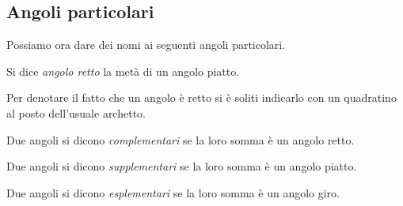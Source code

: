 \subsection{Angoli particolari}

Possiamo ora dare dei nomi ai seguenti angoli particolari.

\begin{definizione}
Si dice \emph{angolo retto} la metà di un angolo piatto.
\end{definizione}

Per denotare il fatto che un angolo è retto si è soliti indicarlo con 
un quadratino al posto dell'usuale archetto.


\begin{inaccessibleblock}
 \begin{figure}[htb]
\centering
\end{figure}
\end{inaccessibleblock}

\begin{definizione}
Due angoli si dicono \emph{complementari} se la loro somma è un 
angolo retto.
\end{definizione}


\begin{inaccessibleblock}
 \begin{figure}[htb]
\centering
\end{figure}
\end{inaccessibleblock}

\begin{definizione}
Due angoli si dicono \emph{supplementari} se la loro somma è un 
angolo piatto.
\end{definizione}


\begin{inaccessibleblock}
 \begin{figure}[htb]
\centering
\end{figure}
\end{inaccessibleblock}

\begin{definizione}
Due angoli si dicono \emph{esplementari} se la loro somma è un angolo 
giro.
\end{definizione}


\begin{inaccessibleblock}
 \begin{figure}[htb]
\centering
\end{figure}
\end{inaccessibleblock}

